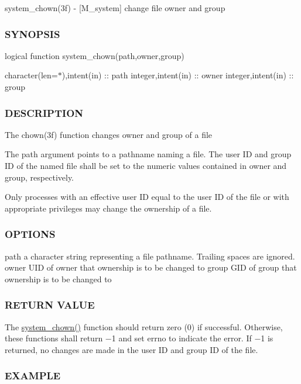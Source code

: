 system\+\_\+chown(3f) -\/ \mbox{[}M\+\_\+system\mbox{]} change file owner and group 

\subsubsection*{S\+Y\+N\+O\+P\+S\+IS}

logical function system\+\_\+chown(path,owner,group)

character(len=$\ast$),intent(in) \+:\+: path integer,intent(in) \+:\+: owner integer,intent(in) \+:\+: group

\subsubsection*{D\+E\+S\+C\+R\+I\+P\+T\+I\+ON}

The chown(3f) function changes owner and group of a file

The path argument points to a pathname naming a file. The user ID and group ID of the named file shall be set to the numeric values contained in owner and group, respectively.

Only processes with an effective user ID equal to the user ID of the file or with appropriate privileges may change the ownership of a file.

\subsubsection*{O\+P\+T\+I\+O\+NS}

path a character string representing a file pathname. Trailing spaces are ignored. owner U\+ID of owner that ownership is to be changed to group G\+ID of group that ownership is to be changed to

\subsubsection*{R\+E\+T\+U\+RN V\+A\+L\+UE}

The \hyperlink{namespacem__system_a3353c1cff032fcfe2985a69f10038ddd}{system\+\_\+chown()} function should return zero (0) if successful. Otherwise, these functions shall return −1 and set errno to indicate the error. If −1 is returned, no changes are made in the user ID and group ID of the file.

\subsubsection*{E\+X\+A\+M\+P\+LE}


